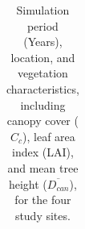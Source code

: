 \documentclass[
  letterpaper,
]{tex/uofsthesis-cs}
\begin{document}
\begin{landscape}

\begin{longtable}[]{@{}
  >{\raggedright\arraybackslash}p{}
  >{\raggedright\arraybackslash}p{}
  >{\raggedleft\arraybackslash}p{}
  >{\raggedleft\arraybackslash}p{}
  >{\raggedleft\arraybackslash}p{}
  >{\raggedleft\arraybackslash}p{}
  >{\raggedleft\arraybackslash}p{}
  >{\raggedleft\arraybackslash}p{}
  >{\raggedright\arraybackslash}p{}@{}}

\caption{\label{tbl-site-meta}Simulation period (Years), location, and
vegetation characteristics, including canopy cover (\(C_c\)), leaf area
index (LAI), and mean tree height (\(\overline{D_{can}}\)), for the four
study sites.}

\tabularnewline


\end{longtable}
\end{landscape}
\end{document}
